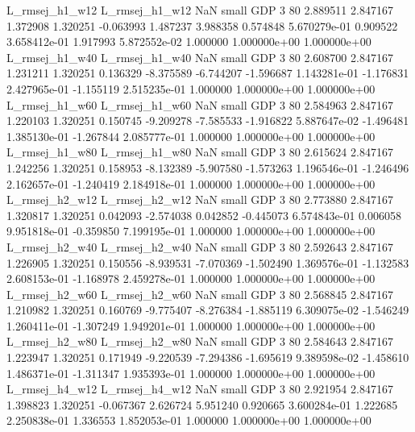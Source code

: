 L_rmsej_h1_w12 L_rmsej_h1_w12                   NaN      small      GDP                 3 80 2.889511       2.847167 1.372908       1.320251   -0.063993      1.487237      3.988358     0.574848   5.670279e-01  0.909522 3.658412e-01     1.917993   5.872552e-02            1.000000    1.000000e+00        1.000000e+00
L_rmsej_h1_w40 L_rmsej_h1_w40                   NaN      small      GDP                 3 80 2.608700       2.847167 1.231211       1.320251    0.136329     -8.375589     -6.744207    -1.596687   1.143281e-01 -1.176831 2.427965e-01    -1.155119   2.515235e-01            1.000000    1.000000e+00        1.000000e+00
L_rmsej_h1_w60 L_rmsej_h1_w60                   NaN      small      GDP                 3 80 2.584963       2.847167 1.220103       1.320251    0.150745     -9.209278     -7.585533    -1.916822   5.887647e-02 -1.496481 1.385130e-01    -1.267844   2.085777e-01            1.000000    1.000000e+00        1.000000e+00
L_rmsej_h1_w80 L_rmsej_h1_w80                   NaN      small      GDP                 3 80 2.615624       2.847167 1.242256       1.320251    0.158953     -8.132389     -5.907580    -1.573263   1.196546e-01 -1.246496 2.162657e-01    -1.240419   2.184918e-01            1.000000    1.000000e+00        1.000000e+00
L_rmsej_h2_w12 L_rmsej_h2_w12                   NaN      small      GDP                 3 80 2.773880       2.847167 1.320817       1.320251    0.042093     -2.574038      0.042852    -0.445073   6.574843e-01  0.006058 9.951818e-01    -0.359850   7.199195e-01            1.000000    1.000000e+00        1.000000e+00
L_rmsej_h2_w40 L_rmsej_h2_w40                   NaN      small      GDP                 3 80 2.592643       2.847167 1.226905       1.320251    0.150556     -8.939531     -7.070369    -1.502490   1.369576e-01 -1.132583 2.608153e-01    -1.168978   2.459278e-01            1.000000    1.000000e+00        1.000000e+00
L_rmsej_h2_w60 L_rmsej_h2_w60                   NaN      small      GDP                 3 80 2.568845       2.847167 1.210982       1.320251    0.160769     -9.775407     -8.276384    -1.885119   6.309075e-02 -1.546249 1.260411e-01    -1.307249   1.949201e-01            1.000000    1.000000e+00        1.000000e+00
L_rmsej_h2_w80 L_rmsej_h2_w80                   NaN      small      GDP                 3 80 2.584643       2.847167 1.223947       1.320251    0.171949     -9.220539     -7.294386    -1.695619   9.389598e-02 -1.458610 1.486371e-01    -1.311347   1.935393e-01            1.000000    1.000000e+00        1.000000e+00
L_rmsej_h4_w12 L_rmsej_h4_w12                   NaN      small      GDP                 3 80 2.921954       2.847167 1.398823       1.320251   -0.067367      2.626724      5.951240     0.920665   3.600284e-01  1.222685 2.250838e-01     1.336553   1.852053e-01            1.000000    1.000000e+00        1.000000e+00
